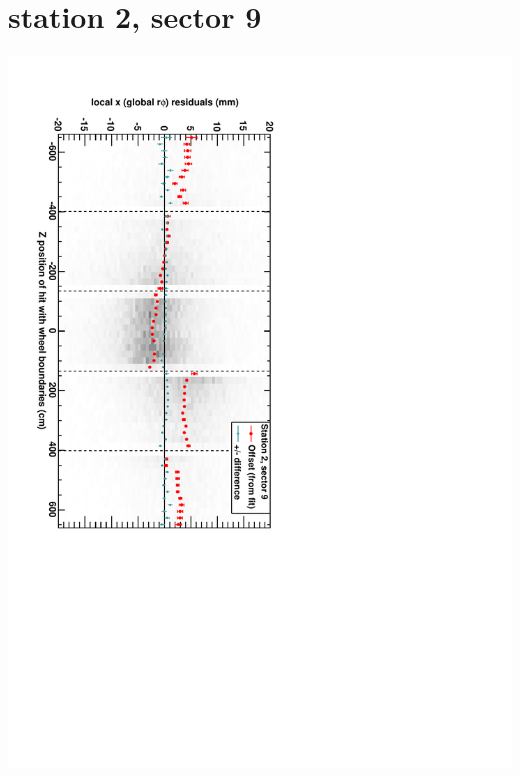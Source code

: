 \documentclass[compress]{beamer}
\begin{document}
\section*{station 2, sector 9}
\begin{frame} \vfill \mbox{\hspace{-1 cm}\includegraphics[height=1.2\linewidth, angle=90]{DTrphiVsZ_st2_sr09.pdf}} \end{frame}
\end{document}
